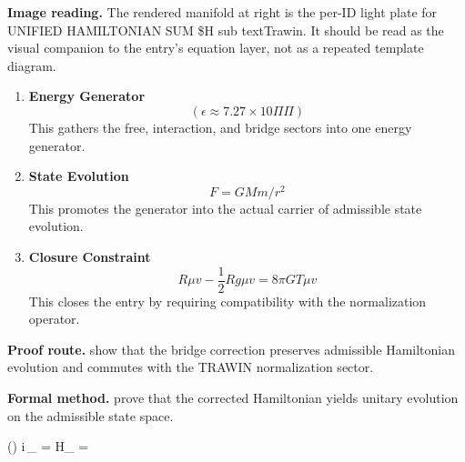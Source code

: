 \begin{samepage}
\noindent\begin{minipage}[t]{0.45\linewidth}
\vspace{0pt}
\raggedright
\scriptsize\textbf{Image reading.} The rendered manifold at right is the per-ID light plate for UNIFIED HAMILTONIAN SUM \$H sub textTrawin. It should be read as the visual companion to the entry's equation layer, not as a repeated template diagram.\par
\end{minipage}\hfill
\begin{minipage}[t]{0.53\linewidth}
\vspace*{-0.10in}
\raggedright
{}
\end{minipage}
\end{samepage}

\clearpage


\begin{enumerate}[leftmargin=1.6em,itemsep=9pt,topsep=6pt]
\item \textbf{Energy Generator}
\[
(\epsilon\approx7.27\times10\Pi\Pi)
\]
This gathers the free, interaction, and bridge sectors into one energy generator.

\item \textbf{State Evolution}
\[
F=GMm/r^{2}
\]
This promotes the generator into the actual carrier of admissible state evolution.

\item \textbf{Closure Constraint}
\[
R\mu v-\frac{1}{2}Rg\mu v=8\pi GT\mu v
\]
This closes the entry by requiring compatibility with the normalization operator.
\end{enumerate}

\textbf{Proof route.} show that the bridge correction preserves admissible Hamiltonian evolution and commutes with the TRAWIN normalization sector.

\textbf{Formal method.} prove that the corrected Hamiltonian yields unitary evolution on the admissible state space.

\medskip
{}

\begin{tzpsnapshot}
\end{tzpsnapshot}

\tzpequationlinks
  {(\epsilon{}\Pi\Pi)}
  {i\hbar\,\partial_{} \Psi = H_{} \Psi}
  { = \cdots}

